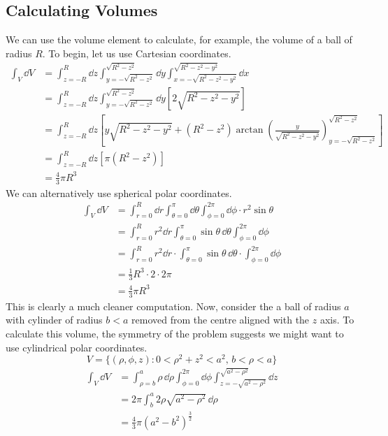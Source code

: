 \documentclass{article}
\begin{document}
\subsection{Calculating Volumes}
We can use the volume element to calculate, for example, the volume of a ball of radius $R$. To begin, let us use Cartesian coordinates.
\begin{align*}
	\int_V \dd{V} & = \int_{z=-R}^R \dd{z} \int_{y = -\sqrt{R^2 - z^2}}^{\sqrt{R^2 - z^2}} \dd{y} \int_{x = -\sqrt{R^2 - z^2 - y^2}}^{\sqrt{R^2 - z^2 - y^2}} \dd{x}                             \\
	              & = \int_{z=-R}^R \dd{z} \int_{y = -\sqrt{R^2 - z^2}}^{\sqrt{R^2 - z^2}} \dd{y} \left[ 2\sqrt{R^2 - z^2 - y^2} \right]                                                         \\
	              & = \int_{z=-R}^R \dd{z} \left[ y\sqrt{R^2 - z^2 - y^2} + (R^2 - z^2) \arctan \left( \frac{y}{\sqrt{R^2 - z^2 - y^2}} \right)_{y=-\sqrt{R^2 - z^2}}^{\sqrt{R^2 - z^2}} \right] \\
	              & = \int_{z=-R}^R \dd{z} \left[ \pi (R^2 - z^2) \right]                                                                                                                        \\
	              & = \frac{4}{3}\pi R^3
\end{align*}
We can alternatively use spherical polar coordinates.
\begin{align*}
	\int_V \dd{V} & = \int_{r=0}^R \dd{r} \int_{\theta=0}^\pi \dd \theta \int_{\phi=0}^{2\pi} \dd \phi \cdot r^2 \sin\theta        \\
	              & = \int_{r=0}^R r^2\dd{r} \int_{\theta=0}^\pi \sin\theta\, \dd \theta \int_{\phi=0}^{2\pi} \dd \phi             \\
	              & = \int_{r=0}^R r^2\dd{r} \cdot \int_{\theta=0}^\pi \sin\theta\, \dd \theta \cdot \int_{\phi=0}^{2\pi} \dd \phi \\
	              & = \frac{1}{3}R^3 \cdot 2 \cdot 2 \pi                                                                           \\
	              & = \frac{4}{3}\pi R^3
\end{align*}
This is clearly a much cleaner computation. Now, consider the a ball of radius $a$ with cylinder of radius $b<a$ removed from the centre aligned with the $z$ axis. To calculate this volume, the symmetry of the problem suggests we might want to use cylindrical polar coordinates.
\[ V = \{ (\rho, \phi, z) \colon 0 < \rho^2 + z^2 < a^2,\, b < \rho < a \} \]
\begin{align*}
	\int_V \dd{V} & = \int_{\rho=b}^a \rho\,\dd \rho \int_{\phi=0}^{2\pi} \dd \phi \int_{z=-\sqrt{a^2 - \rho^2}}^{\sqrt{a^2 - \rho^2}} \dd{z} \\
	              & = 2 \pi \int_b^a 2\rho\sqrt{a^2 - \rho^2}\,\dd \rho                                                                       \\
	              & = \frac{4}{3}\pi (a^2 - b^2)^{\frac{3}{2}}
\end{align*}
\end{document}
